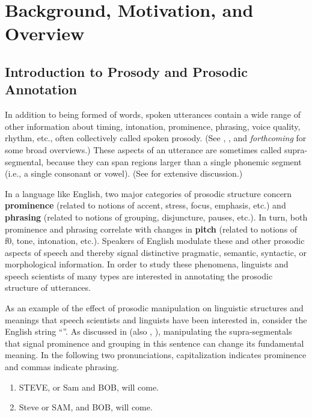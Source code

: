 \chapter{Background, Motivation, and Overview}\label{ch:background}

\section{Introduction to Prosody and Prosodic Annotation}\label{sec:introduction-to-prosody-and-prosodic-annotation}

In addition to being formed of words, spoken utterances contain a wide range of other information about timing, intonation, prominence, phrasing, voice quality, rhythm, etc., often collectively called spoken prosody. (See \citealt{ladd08}, \citealt{beckmanvenditti11}, and \citeauthor{barnesshattuckhufnagel20} \textit{forthcoming} for some broad overviews.) These aspects of an utterance are sometimes called supra-segmental, because they can span regions larger than a single phonemic segment (i.e., a single consonant or vowel). (See \citealt{lehiste70} for extensive discussion.)

In a language like English, two major categories of prosodic structure concern \textbf{prominence} (related to notions of accent, stress, focus, emphasis, etc.) and \textbf{phrasing} (related to notions of grouping, disjuncture, pauses, etc.). In turn, both prominence and phrasing correlate with changes in \textbf{pitch} (related to notions of f0, tone, intonation, etc.). Speakers of English modulate these and other prosodic aspects of speech and thereby signal distinctive pragmatic, semantic, syntactic, or morphological information. In order to study these phenomena, linguists and speech scientists of many types are interested in annotating the prosodic structure of utterances.

As an example of the effect of prosodic manipulation on linguistic structures and meanings that speech scientists and linguists have been interested in, consider the English string “”. As discussed in \citealt{lehiste73} (also \citealt{price-91}, \citealt{veilleux-06}), manipulating the supra-segmentals that signal prominence and grouping in this sentence can change its fundamental meaning. In the following two pronunciations, capitalization indicates prominence and commas indicate phrasing.

\begin{enumerate} \def\labelenumi{\arabic{enumi}.}
\item STEVE, or Sam and BOB, will come.
\item Steve or SAM, and BOB, will come. \end{enumerate}

